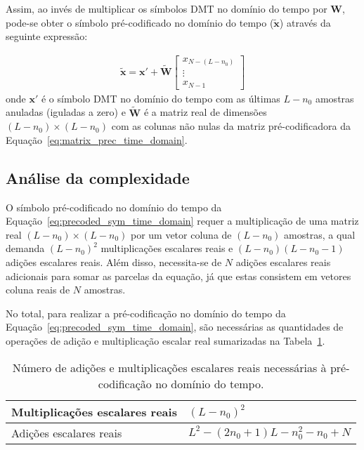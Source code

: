 Assim, ao invés de multiplicar os símbolos DMT no domínio do tempo por $\mathbf{W}$, pode-se obter o símbolo pré-codificado no domínio do tempo ($\mathbf{\tilde{x}}$) através da seguinte expressão:

\begin{align}
\mathbf{\tilde{x}} = \mathbf{x'} + \tilde{\mathbf{W}} \left[ \begin{array}{c}
x_{N - (L - n_0)}\\
\vdots\\
x_{N-1}
\end{array} \right]
\label{eq:precoded_sym_time_domain}
\end{align}
onde $\mathbf{x}'$ é o símbolo DMT no domínio do tempo com as últimas $L-n_0$ amostras anuladas (iguladas a zero) e $\tilde{\mathbf{W}}$ é a matriz real de dimensões $\left( L - n_0 \right) \times \left( L - n_0 \right)$ com as colunas não nulas da matriz pré-codificadora da Equação~\ref{eq:matrix_prec_time_domain}.

\subsection{Análise da complexidade}

O símbolo pré-codificado no domínio do tempo da Equação~\ref{eq:precoded_sym_time_domain} requer a multiplicação de uma matriz real $\left( L - n_0 \right) \times \left( L - n_0 \right)$ por um vetor coluna de $\left( L - n_0 \right)$ amostras, a qual demanda  $\left( L - n_0 \right)^2$ multiplicações escalares reais e  $\left( L - n_0 \right)\left( L - n_0 -1\right)$ adições escalares reais. Além disso, necessita-se de $N$ adições escalares reais adicionais para somar as parcelas da equação, já que estas consistem em vetores coluna reais de $N$ amostras.

No total, para realizar a pré-codificação no domínio do tempo da Equação~\ref{eq:precoded_sym_time_domain}, são necessárias as quantidades de operações de adição e multiplicação escalar real sumarizadas na Tabela~\ref{tab:time_domain_precoder_complexity}.

\begin{table}[htbp]
\centering
\begin{tabular}{ p{5cm} | p{5 cm} }
\hline
\hline
Multiplicações escalares reais & $\left(L -n_0\right)^2$\\
\hline
Adições escalares reais & $L^2 - \left(2n_0 +1\right)L -n_0^2 -n_0 + N$\\
\hline
\end{tabular}
\caption{Número de adições e multiplicações escalares reais necessárias à pré-codificação no domínio do tempo. \label{tab:time_domain_precoder_complexity}}
\end{table}

